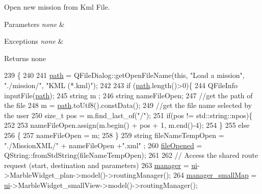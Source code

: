Open new mission from Kml File. 


\begin{DoxyParams}{Parameters}
{\em none} & \\
\hline
\end{DoxyParams}

\begin{DoxyExceptions}{Exceptions}
{\em none} & \\
\hline
\end{DoxyExceptions}
\begin{DoxyReturn}{Returns}
none 
\end{DoxyReturn}

\begin{DoxyCode}
239                        \{
240 
241     \hyperlink{a00008_a34b772573db9a14b1acb61b24709ae73}{path} = QFileDialog::getOpenFileName(\textcolor{keyword}{this}, \textcolor{stringliteral}{"Load a mission"}, \textcolor{stringliteral}{"./mission/"}, \textcolor{stringliteral}{"KML (*.kml)"});
242 
243     \textcolor{keywordflow}{if} (\hyperlink{a00008_a34b772573db9a14b1acb61b24709ae73}{path}.length()>0)\{
244         QFileInfo inputFile(\hyperlink{a00008_a34b772573db9a14b1acb61b24709ae73}{path});
245         \textcolor{keywordtype}{string} m ;
246         \textcolor{keywordtype}{string} nameFileOpen;
247         \textcolor{comment}{//get the path of the file}
248         m = \hyperlink{a00008_a34b772573db9a14b1acb61b24709ae73}{path}.toUtf8().constData();
249         \textcolor{comment}{//get the file name selected by the user}
250         \textcolor{keywordtype}{size\_t} pos = m.find\_last\_of(\textcolor{stringliteral}{"/"});
251         \textcolor{keywordflow}{if}(pos != std::string::npos)\{
252 
253             nameFileOpen.assign(m.begin() + pos + 1, m.end()-4);
254         \}
255           \textcolor{keywordflow}{else}
256         \{
257           nameFileOpen = m;
258       \}
259         \textcolor{keywordtype}{string} fileNameTempOpen = \textcolor{stringliteral}{"./MissionXML/"} + nameFileOpen +\textcolor{stringliteral}{".xml"} ;
260         \hyperlink{a00008_ae55f476d1700ade204b3038b8c37f8ba}{fileOpened} =  QString::fromStdString(fileNameTempOpen);
261 
262         \textcolor{comment}{// Access the shared route request (start, destination and parameters)}
263         \hyperlink{a00008_a02d3f124c170b0126dab54f6e5a18dae}{manager} = \hyperlink{a00008_a6dc041ef6a2ffb329928d2913e8344e6}{ui}->MarbleWidget\_plan->model()->routingManager();
264         \hyperlink{a00008_aca10b4dc402bfe3d17f1fcba33544252}{manager\_smallMap} = \hyperlink{a00008_a6dc041ef6a2ffb329928d2913e8344e6}{ui}->MarbleWidget\_smallView->model()->routingManager();

\end{DoxyCode}
